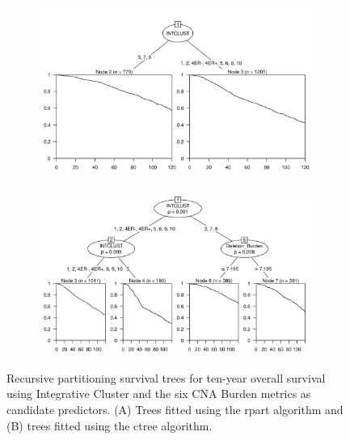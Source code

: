 \begin{figure}[!htb]
\centering

\vspace{0.5cm}

\begin{subfigure}{\textwidth}
\subcaption{}
\includegraphics[width=1\textwidth]{../figures/Appendices/Appendix_B/PartyKit_Survival_Burden_TenYearOS_INTCLUST.png}
\end{subfigure}

\vspace{2cm}

\begin{subfigure}{\textwidth}
\subcaption{}
\includegraphics[width=1\textwidth]{../figures/Appendices/Appendix_B/Ctree_Survival_Burden_TenYearOS_INTCLUST.png}
\end{subfigure}

\vspace{0.5cm}

\caption[Recursive partitioning survival trees for ten-year overall survival using Integrative Cluster and the six CNA Burden metrics as candidate predictors.]{Recursive partitioning survival trees for ten-year overall survival using Integrative Cluster and the six CNA Burden metrics as candidate predictors. (A) Trees fitted using the rpart algorithm and (B) trees fitted using the ctree algorithm.}
\end{figure}

